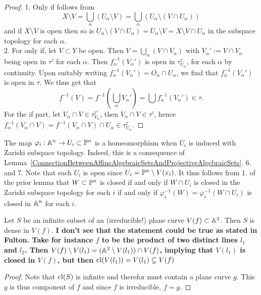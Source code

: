     \begin{proof}
        1. Only if follows from
        $$X\setminus V = \bigcup_\alpha (U_\alpha\setminus V)= \bigcup_\alpha (U_\alpha\setminus (V\cap U_\alpha))$$
        and if $X\setminus V$ is open then so is $U_\alpha\setminus (V\cap U_\alpha) = U_\alpha \setminus V = X\setminus V \cap U_\alpha$ in the subspace topology for each $\alpha$.\\
        2. For only if, let $V\subset Y$ be open. Then $V = \bigcup_\alpha (V\cap V_\alpha)$ with $V_\alpha':=V\cap V_\alpha$ being open in $\tau'$ for each $\alpha$. Then $f_\alpha^{-1}(V_\alpha')$ is open in $\tau_{U_\alpha}^\tau$, for each $\alpha$ by continuity. Upon suitably writing $f_\alpha^{-1}(V_\alpha')= O_\alpha\cap U_\alpha$, we find that $f_\alpha^{-1}(V_\alpha')$ is open in $\tau$. We thus get that
        $$f^{-1}(V)=f^{-1}\left(\bigcup_\alpha V_\alpha'\right)= \bigcup f_\alpha^{-1}(V_\alpha')\in \tau.$$
        For the if part, let $V_\alpha\cap V \in \tau_{V_\alpha}^{\tau'}$, then $V_\alpha \cap V\in \tau'$, hence $f_\alpha^{-1}(V_\alpha\cap V)= f^{-1}(V_\alpha\cap V)\cap U_\alpha \in \tau_{U_\alpha}^\tau$. 
    \end{proof}
    \begin{example}
        The map $\varphi_i : \mathbb{A}^n \rightarrow U_i \subset \mathbb{P}^n$ is a homeomorphism when $U_i$ is induced with Zariski subspace topology. Indeed, this is a consequence of Lemma~\ref{ConnectionBetweenAffineAlgebraicSetsAndProjectiveAlgebraicSets}. 6. and 7. Note that each $U_i$ is open since $U_i = \mathbb{P}^n\setminus V(x_i)$. It thus follows from 1. of the prior lemma that $W\subset \mathbb{P}^n$ is closed if and only if $W\cap U_i$ is closed in the Zariski subspace topology for each $i$ if and only if $\varphi_i^{-1}(W)= \varphi_i^{-1}(W\cap U_i)$ is closed in $\mathbb{A}^n$ for each $i$. 
    \end{example}
    \begin{proposition}
        Let $S$ be an infinite subset of an (irreducible!) plane curve $V(f)\subset \mathbb{A}^2$. Then $S$ is dense in $V(f)$. \textbf{I don't see that the statement could be true as stated in Fulton. Take for instance $f$ to be the product of two distinct lines $l_1$ and $l_2$. Then $V(f)\setminus V(l_1) = (\mathbb{A}^2\setminus V(l_1))\cap V(f)$, implying that $V(l_1)$ is closed in $V(f)$, but then $\mathrm{cl}(V(l_1))=V(l_1)\subsetneq V(f)$}
    \end{proposition}
    \begin{proof}
        Note that $\mathrm{cl}(S)$ is infinite and therefor must contain a plane curve $g$. This $g$ is thus component of $f$ and since $f$ is irreducible, $f=g$.
    \end{proof}

